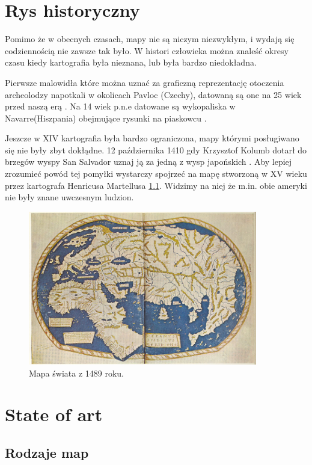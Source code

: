 
\chapter{Rys historyczny}
\label{sec:hisotryMap}

Pomimo że w obecnych czasach, mapy nie są niczym niezwykłym, i wydają się codziennością nie zawsze tak było. W histori człowieka można znaleść okresy czasu kiedy kartografia była nieznana, lub była bardzo niedokładna.

Pierwsze malowidła które można uznać za graficzną reprezentację otoczenia archeolodzy napotkali w okolicach Pavloc (Czechy), datowaną są one na 25 wiek przed naszą erą \cite{pre2} . Na 14 wiek p.n.e datowane są wykopaliska w Navarre(Hiszpania) obejmujące rysunki na piaskowcu \cite{pre1}.

Jeszcze w XIV kartografia była bardzo ograniczona, mapy którymi posługiwano się nie były zbyt dokłądne. 12 października 1410 gdy Krzysztof Kolumb dotarł do brzegów wyspy San Salvador uznaj ją za jedną z wysp japońskich \cite{columb}. Aby lepiej zrozumieć powód tej pomyłki wystarczy spojrzeć na mapę stworzoną w XV wieku przez kartografa Henricusa Martellusa \ref{fig:worldMap1}. Widzimy na niej że m.in. obie ameryki nie były znane uwczesnym ludzion.

\begin{figure}[H]
  \centering
    \includegraphics[width=100mm]{ge/worldMap1.jpg}
  \caption{Mapa świata z 1489 roku.}
  \label{fig:worldMap1}
\end{figure}

\chapter{State of art}
\label{cha:State of art}

\section{Rodzaje map}
\label{sec:Rodzaje map}

